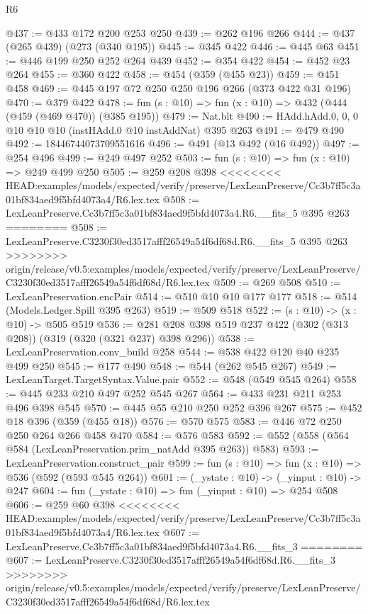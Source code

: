 \begin{lexlean}{R6}
\begin{coremodule}
{{{{{{{{{{{{{{{@437 := @433 @172 @200 @253 @250
@439 := @262 @196 @266
@444 := @437 (@265 @439) (@273 (@340 @195))
@445 := @345 @422
@446 := @445 @63
@451 := @446 @199 @250 @252 @264 @439
@452 := @354 @422
@454 := @452 @23 @264
@455 := @360 @422
@458 := @454 (@359 (@455 @23))
@459 := @451 @458
@469 := @445 @197 @72 @250 @250 @196 @266 (@373 @422 @31 @196)
@470 := @379 @422
@478 := fun (s : @10) => fun (x : @10) => @432 (@444 (@459 (@469 @470)) (@385 @195))
@479 := Nat.blt
@490 := HAdd.hAdd.{0, 0, 0} @10 @10 @10 (instHAdd.{0} @10 instAddNat) @395 @263
@491 := @479 @490
@492 := 18446744073709551616
@496 := @491 (@13 @492 (@16 @492))
@497 := @254 @496
@499 := @249 @497 @252
@503 := fun (s : @10) => fun (x : @10) => @249 @499 @250
@505 := @259 @208 @398
<<<<<<<< HEAD:examples/models/expected/verify/preserve/LexLeanPreserve/Cc3b7ff5c3a01bf834aed9f5bfd4073a4/R6.lex.tex
@508 := LexLeanPreserve.Cc3b7ff5c3a01bf834aed9f5bfd4073a4.R6.__fits_5 @395 @263
========
@508 := LexLeanPreserve.C3230f30ed3517afff26549a54f6df68d.R6.__fits_5 @395 @263
>>>>>>>> origin/release/v0.5:examples/models/expected/verify/preserve/LexLeanPreserve/C3230f30ed3517afff26549a54f6df68d/R6.lex.tex
@509 := @269 @508
@510 := LexLeanPreservation.encPair
@514 := @510 @10 @10 @177 @177
@518 := @514 (Models.Ledger.Spill @395 @263)
@519 := @509 @518
@522 := (s : @10) -> (x : @10) -> @505 @519
@536 := @281 @208 @398 @519 @237 @422 (@302 (@313 @208)) (@319 (@320 (@321 @237) @398 @296))
@538 := LexLeanPreservation.conv_build @258
@544 := @538 @422 @120 @40 @235 @499 @250
@545 := @177 @490
@548 := @544 (@262 @545 @267)
@549 := LexLeanTarget.TargetSyntax.Value.pair
@552 := @548 (@549 @545 @264)
@558 := @445 @233 @210 @497 @252 @545 @267
@564 := @433 @231 @211 @253 @496 @398 @545
@570 := @445 @55 @210 @250 @252 @396 @267
@575 := @452 @18 @396 (@359 (@455 @18))
@576 := @570 @575
@583 := @446 @72 @250 @250 @264 @266 @458 @470
@584 := @576 @583
@592 := @552 (@558 (@564 @584 (LexLeanPreservation.prim_natAdd @395 @263)) @583)
@593 := LexLeanPreservation.construct_pair
@599 := fun (s : @10) => fun (x : @10) => @536 (@592 (@593 @545 @264))
@601 := (_ystate : @10) -> (_yinput : @10) -> @247
@604 := fun (_ystate : @10) => fun (_yinput : @10) => @254 @508
@606 := @259 @60 @398
<<<<<<<< HEAD:examples/models/expected/verify/preserve/LexLeanPreserve/Cc3b7ff5c3a01bf834aed9f5bfd4073a4/R6.lex.tex
@607 := LexLeanPreserve.Cc3b7ff5c3a01bf834aed9f5bfd4073a4.R6.__fits_3
========
@607 := LexLeanPreserve.C3230f30ed3517afff26549a54f6df68d.R6.__fits_3
>>>>>>>> origin/release/v0.5:examples/models/expected/verify/preserve/LexLeanPreserve/C3230f30ed3517afff26549a54f6df68d/R6.lex.tex
}}}}}}}}}}}}}}}
\end{coremodule}
\end{lexlean}
